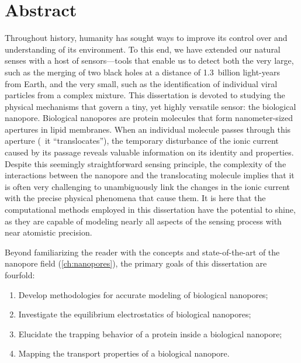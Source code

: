 \chapter{Abstract}
%
\label{ch:abstract}
%

Throughout history, humanity has sought ways to improve its control over and understanding of its environment.
To this end, we have extended our natural senses with a host of sensors---tools that enable us to detect both the very
large, such as the merging of two black holes at a distance of \num{1.3}~billion light-years from Earth, and
the very small, such as the identification of individual viral particles from a complex mixture. This
dissertation is devoted to studying the physical mechanisms that govern a tiny, yet highly versatile sensor:
the biological nanopore. Biological nanopores are protein molecules that form nanometer-sized apertures in
lipid membranes. When an individual molecule passes through this aperture (\ie~it ``translocates''), the
temporary disturbance of the ionic current caused by its passage reveals valuable information on its identity
and properties. Despite this seemingly straightforward sensing principle, the complexity of the interactions
between the nanopore and the translocating molecule implies that it is often very challenging to unambiguously
link the changes in the ionic current with the precise physical phenomena that cause them. It is here that
the computational methods employed in this dissertation have the potential to shine, as they are capable of
modeling nearly all aspects of the sensing process with near atomistic precision.

Beyond familiarizing the reader with the concepts and state-of-the-art of the nanopore field
(\cref{ch:nanopores}), the primary goals of this dissertation are fourfold:
%
\begin{enumerate}
  \item Develop methodologies for accurate modeling of biological nanopores;
  \item Investigate the equilibrium electrostatics of biological nanopores;
  \item Elucidate the trapping behavior of a protein inside a biological nanopore;
  \item Mapping the transport properties of a biological nanopore.
\end{enumerate}
%

